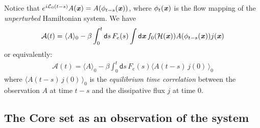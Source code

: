 \documentclass[aip,jcp,a4paper,reprint,onecolumn]{revtex4-1}
\newcommand{\vect}[1]{\textbf{\textit{#1}}}
\newcommand{\dd}{\textsf{d}}
\newcommand{\mh}{\mathcal H}
\newcommand{\ml}{\mathcal L}
\begin{document}
Notice that $e^{i\ml_0(t-s)}A(\vect x) = A(\phi_{t-s}(\vect x))$,
where $\phi_t(\vect x)$ is the flow mapping of the \emph{unperturbed}
Hamiltonian system. We have
\begin{align}
  \mathcal A(t)
  =
  \langle A\rangle_0
  -
  \beta
  \int_0^t\dd s\,
  F_e(s)
  \int \dd \vect x\,
  f_0(\mh(\vect x))
  A(\phi_{t-s}(\vect x))
  j(\vect x)  
\end{align}
or equivalently:
\begin{align}\label{eqn:lr}
  \mathcal A(t)
  =
  \langle A\rangle_0
  -
  \beta
  \int_0^t\dd s\,
  F_e(s)
  \langle
  A(t-s)\,
  j(0)\,
  \rangle_0
\end{align}
where $\langle A(t-s)\,j(0)\,\rangle_0$ is the \emph{equilibrium time
  correlation} between the observation $A$ at time $t-s$ and the
dissipative flux $j$ at time 0.


\subsection{The Core set as an observation of the system}
\end{document}
